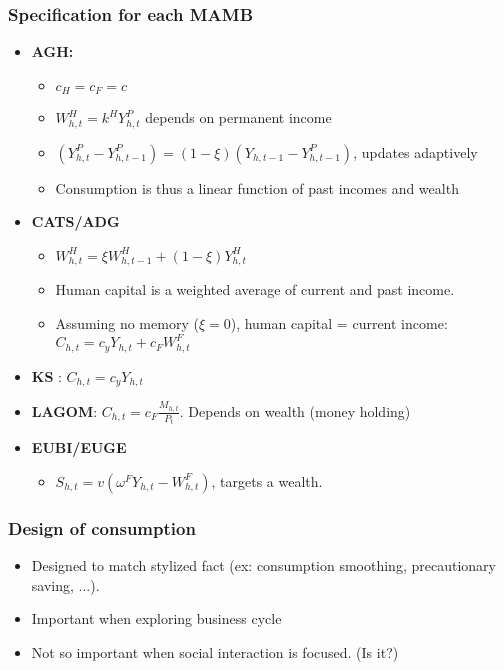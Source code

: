 \begin{frame}
    \frametitle{Specification for each MAMB}

    \begin{itemize}
        \item<1-> \textbf{AGH:} 
        \begin{itemize}
            \item $c_H = c_F = c$
            \item $W^H_{h,t} = k^H Y^P_{h,t}$ depends on permanent income 
            \item $(Y^P_{h,t} - Y^P_{h,t-1}) = (1 - \xi) (Y_{h, t-1} - Y^P_{h,t-1})$, updates adaptively
            \item Consumption is thus a linear function of past incomes and wealth  
        \end{itemize}
        \item<2-> \textbf{CATS/ADG}
        \begin{itemize}
            \item $W^H_{h,t} = \xi W^H_{h, t-1} + (1-\xi) Y^H_{h,t} $
            \item Human capital is a weighted average of current and past income. 
            \item Assuming no memory ($\xi = 0$), human capital = current income: $C_{h,t} = c_y Y_{h,t} + c_F W^F_{h,t}$
        \end{itemize}
        \item<3-> \textbf{KS} : $C_{h,t} = c_y Y_{h,t}$
        \item<4-> \textbf{LAGOM}: $C_{h,t} = c_F \frac{M_{h,t}}{P_t}$. Depends on wealth (money holding)
        \item<5-> \textbf{EUBI/EUGE}
        \begin{itemize}
            \item $ S_{h,t} = v(\omega^F Y_{h,t} - W^F_{h,t}) $, targets a wealth.
        \end{itemize}
    \end{itemize}

\end{frame}

\begin{frame}
    \frametitle{Design of consumption}

    \begin{itemize}
        \item Designed to match stylized fact (ex: consumption smoothing, precautionary saving, ...).
        \item Important when exploring business cycle
        \item Not so important when social interaction is focused. (Is it?)
    \end{itemize}

\end{frame}

